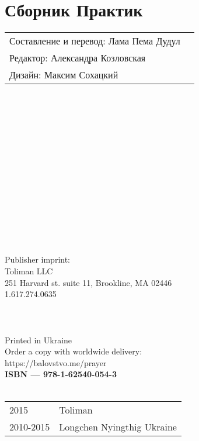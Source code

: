 \section*{Сборник Практик}

\begin{tabular}{ll}
Составление и перевод: Лама Пема Дудул\\
Редактор: Александра Козловская\\
Дизайн: Максим Сохацкий\\
\end{tabular}
\\
\\
\\
\\
\\
\\
\\
\\
\\
\\
\\
\\
\\
\\
Publisher imprint: \\
Toliman LLC \\
251 Harvard st. suite 11, Brookline, MA 02446 \\
1.617.274.0635 \\
\\
\\
\\
Printed in Ukraine \\

Order a copy with worldwide delivery: \\
https://balovstvo.me/prayer \\

{\bf  ISBN — 978-1-62540-054-3 \hspace{2em}} \\ \\

\begin{tabular}{ll}
\textcopyright{} 2015 & Toliman \\
\textcopyright{} 2010-2015 & Longchen Nyingthig Ukraine
\end{tabular}
